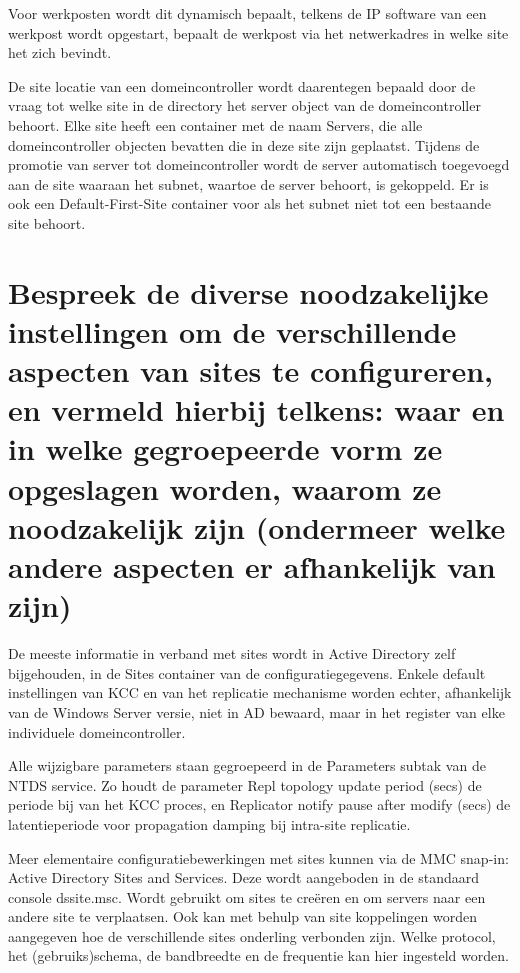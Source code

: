 Voor werkposten wordt dit dynamisch bepaalt, telkens de IP software van een
werkpost wordt opgestart, bepaalt de werkpost via het netwerkadres in welke site
het zich bevindt.

De site locatie van een domeincontroller wordt daarentegen bepaald door de vraag
tot welke site in de directory het server object van de domeincontroller
behoort. Elke site heeft een container met de naam Servers, die alle
domeincontroller objecten bevatten die in deze site zijn geplaatst. Tijdens de
promotie van server tot domeincontroller wordt de server automatisch toegevoegd
aan de site waaraan het subnet, waartoe de server behoort, is gekoppeld. Er is
ook een Default-First-Site container voor als het subnet niet tot een bestaande
site behoort.

\section{Bespreek de diverse noodzakelijke instellingen om de verschillende
aspecten van sites te configureren, en vermeld hierbij telkens: waar en in welke
gegroepeerde vorm ze opgeslagen worden, waarom ze noodzakelijk zijn (ondermeer
welke andere aspecten er afhankelijk van zijn)}

De meeste informatie in verband met sites wordt in Active Directory zelf
bijgehouden, in de Sites container van de configuratiegegevens. Enkele default
instellingen van KCC en van het replicatie mechanisme worden echter, afhankelijk
van de Windows Server versie, niet in AD bewaard, maar in het register van elke
individuele domeincontroller.

Alle wijzigbare parameters staan gegroepeerd in de Parameters subtak van de NTDS
service. Zo houdt de parameter Repl topology update period (secs) de periode bij
van het KCC proces, en Replicator notify pause after modify (secs) de
latentieperiode voor propagation damping bij intra-site replicatie.

Meer elementaire configuratiebewerkingen met sites kunnen via de MMC snap-in:
Active Directory Sites and Services. Deze wordt aangeboden in de standaard
console dssite.msc. Wordt gebruikt om sites te creëren en om servers naar een
andere site te verplaatsen. Ook kan met behulp van site koppelingen worden
aangegeven hoe de verschillende sites onderling verbonden zijn. Welke protocol,
het (gebruiks)schema, de bandbreedte en de frequentie kan hier ingesteld worden.
